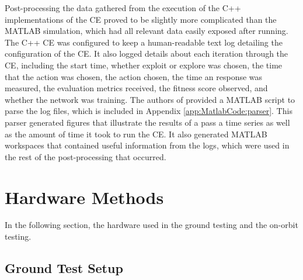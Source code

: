 \par Post-processing the data gathered from the execution of the C++ implementations of the CE proved to be slightly more complicated than the MATLAB simulation, which had all relevant data easily exposed after running. The C++ CE was configured to keep a human-readable text log detailing the configuration of the CE. It also logged details about each iteration through the CE, including the start time, whether exploit or explore was chosen, the time that the action was chosen, the action chosen, the time an response was measured, the evaluation metrics received, the fitness score observed, and whether the network was training. The authors of \cite{tim_implementation_paper} provided a MATLAB script to parse the log files, which is included in Appendix \ref{app:MatlabCode:parser}. This parser generated figures that illustrate the results of a pass a time series as well as the amount of time it took to run the CE. It also generated MATLAB workspaces that contained useful information from the logs, which were used in the rest of the post-processing that occurred.


\section{Hardware Methods}\label{methods:hardware}
\par In the following section, the hardware used in the ground testing and the on-orbit testing.
\subsection{Ground Test Setup}

